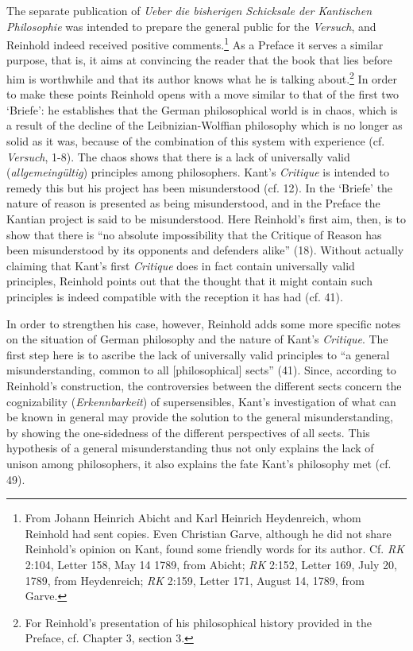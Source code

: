 The separate publication of \textit{Ueber die bisherigen Schicksale der Kantischen Philosophie }was intended to prepare the general public for the \textit{Versuch}, and Reinhold indeed received positive comments.\footnote{ From Johann Heinrich Abicht and Karl Heinrich Heydenreich, whom Reinhold had sent copies. Even Christian Garve, although he did not share Reinhold's opinion on Kant, found some friendly words for its author. Cf. \textit{RK} 2:104, Letter 158, May 14 1789, from Abicht; \textit{RK} 2:152, Letter 169, July 20, 1789, from Heydenreich; \textit{RK} 2:159, Letter 171, August 14, 1789, from Garve. } As a Preface it serves a similar purpose, that is, it aims at convincing the reader that the book that lies before him is worthwhile and that its author knows what he is talking about.\footnote{ For Reinhold's presentation of his philosophical history provided in the Preface, cf. Chapter 3, section 3. } In order to make these points Reinhold opens with a move similar to that of the first two `Briefe': he establishes that the German philosophical world is in chaos, which is a result of the decline of the Leibnizian{-}Wolffian philosophy which is no longer as solid as it was, because of the combination of this system with experience (cf. \textit{Versuch}, 1{-}8). The chaos shows that there is a lack of universally valid (\textit{allgemeing\"{u}ltig}) principles among philosophers. Kant's \textit{Critique} is intended to remedy this but his project has been misunderstood (cf. 12). In the `Briefe' the nature of reason is presented as being misunderstood, and in the Preface the Kantian project is said to be misunderstood. Here Reinhold's first aim, then, is to show that there is ``no absolute impossibility that the Critique of Reason has been misunderstood by its opponents and defenders alike'' (18). Without actually claiming that Kant's first \textit{Critique} does in fact contain universally valid principles, Reinhold points out that the thought that it might contain such principles is indeed compatible with the reception it has had (cf. 41).

 In order to strengthen his case, however, Reinhold adds some more specific notes on the situation of German philosophy and the nature of Kant's \textit{Critique}. The first step here is to ascribe the lack of universally valid principles to ``a general misunderstanding, common to all [philosophical] sects'' (41). Since, according to Reinhold's construction, the controversies between the different sects concern the cognizability (\textit{Erkennbarkeit}) of supersensibles, Kant's investigation of what can be known in general may provide the solution to the general misunderstanding, by showing the one{-}sidedness of the different perspectives of all sects. This hypothesis of a general misunderstanding thus not only explains the lack of unison among philosophers, it also explains the fate Kant's philosophy met (cf. 49). 

